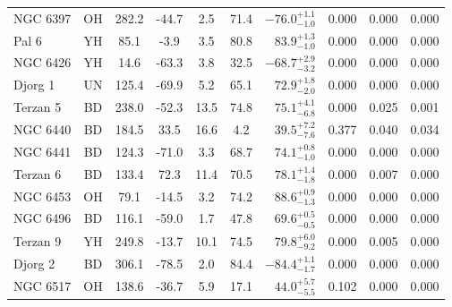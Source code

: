 \begin{tabular}{lcccccrccc}
	NGC 6397 & OH & 282.2 & -44.7 & 2.5 & 71.4 & $-76.0^{+1.1}_{-1.0}$ & 0.000 & 0.000 & 0.000 \\
	Pal 6 & YH & 85.1 & -3.9 & 3.5 & 80.8 & $83.9^{+1.3}_{-1.0}$ & 0.000 & 0.000 & 0.000 \\
	NGC 6426 & YH & 14.6 & -63.3 & 3.8 & 32.5 & $-68.7^{+2.9}_{-3.2}$ & 0.000 & 0.000 & 0.000 \\
	Djorg 1 & UN & 125.4 & -69.9 & 5.2 & 65.1 & $72.9^{+1.8}_{-2.0}$ & 0.000 & 0.000 & 0.000 \\
	Terzan 5 & BD & 238.0 & -52.3 & 13.5 & 74.8 & $75.1^{+4.1}_{-6.8}$ & 0.000 & 0.025 & 0.001 \\
	NGC 6440 & BD & 184.5 & 33.5 & 16.6 & 4.2 & $39.5^{+7.2}_{-7.6}$ & 0.377 & 0.040 & 0.034 \\
	NGC 6441 & BD & 124.3 & -71.0 & 3.3 & 68.7 & $74.1^{+0.8}_{-1.0}$ & 0.000 & 0.000 & 0.000 \\
	Terzan 6 & BD & 133.4 & 72.3 & 11.4 & 70.5 & $78.1^{+1.4}_{-1.8}$ & 0.000 & 0.007 & 0.000 \\
	NGC 6453 & OH & 79.1 & -14.5 & 3.2 & 74.2 & $88.6^{+0.9}_{-1.3}$ & 0.000 & 0.000 & 0.000 \\
	NGC 6496 & BD & 116.1 & -59.0 & 1.7 & 47.8 & $69.6^{+0.5}_{-0.5}$ & 0.000 & 0.000 & 0.000 \\
	Terzan 9 & YH & 249.8 & -13.7 & 10.1 & 74.5 & $79.8^{+6.0}_{-9.2}$ & 0.000 & 0.005 & 0.000 \\
	Djorg 2 & BD & 306.1 & -78.5 & 2.0 & 84.4 & $-84.4^{+1.1}_{-1.7}$ & 0.000 & 0.000 & 0.000 \\
	NGC 6517 & OH & 138.6 & -36.7 & 5.9 & 17.1 & $44.0^{+5.7}_{-5.5}$ & 0.102 & 0.000 & 0.000 \\
	\bottomrule
\end{tabular}
\endgroup